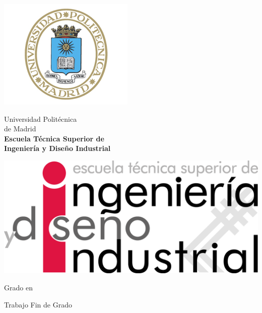 \begin{titlepage}

  \begin{minipage}{0.15\linewidth}
    \hspace*{-2.0cm}
    \noindent
    \includegraphics[scale=0.4]{./include/EscUpm.png} \qquad\qquad
  \end{minipage}
  \begin{minipage}{0.7\linewidth}
    \begin{center}
      \huge{ Universidad Politécnica\\de Madrid }\\
      \vspace*{0.5cm}
      \Large{\textbf{Escuela Técnica Superior de \\Ingeniería y Diseño Industrial}}
    \end{center}
  \end{minipage}
  \begin{minipage}{0.2\linewidth}
    \includegraphics[scale=0.4]{./include/ETSIDI_Logo_color.png}
  \end{minipage}

  \vspace*{1cm}
  \begin{center}
    \Large{Grado en  \Grado{} }
  \end{center}

  \vspace*{1cm}
  \begin{center}
    \huge{Trabajo Fin de Grado}
  \end{center}


\end{titlepage}
